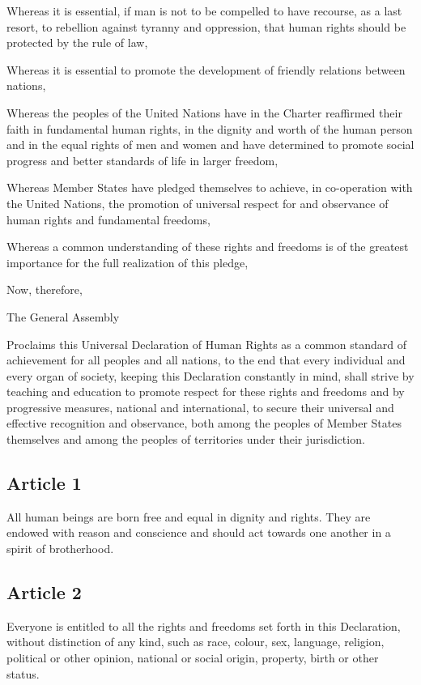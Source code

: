 \documentclass[
  titlepage,
  openright,
  DIV=calc,
  toc=listof,
  listof=nochaptergap]{scrbook}
\begin{document}
Whereas it is essential, if man is not to be compelled to have recourse,
as a last resort, to rebellion against tyranny and oppression, that
human rights should be protected by the rule of law,

Whereas it is essential to promote the development of friendly relations
between nations,

Whereas the peoples of the United Nations have in the Charter reaffirmed
their faith in fundamental human rights, in the dignity and worth of the
human person and in the equal rights of men and women and have
determined to promote social progress and better standards of life in
larger freedom,

Whereas Member States have pledged themselves to achieve, in
co-operation with the United Nations, the promotion of universal respect
for and observance of human rights and fundamental freedoms,

Whereas a common understanding of these rights and freedoms is of the
greatest importance for the full realization of this pledge,

Now, therefore,

The General Assembly

Proclaims this Universal Declaration of Human Rights as a common
standard of achievement for all peoples and all nations, to the end that
every individual and every organ of society, keeping this Declaration
constantly in mind, shall strive by teaching and education to promote
respect for these rights and freedoms and by progressive measures,
national and international, to secure their universal and effective
recognition and observance, both among the peoples of Member States
themselves and among the peoples of territories under their
jurisdiction.

\subsection{Article 1}\label{article-1-3}

All human beings are born free and equal in dignity and rights. They are
endowed with reason and conscience and should act towards one another in
a spirit of brotherhood.

\subsection{Article 2}\label{article-2-3}

Everyone is entitled to all the rights and freedoms set forth in this
Declaration, without distinction of any kind, such as race, colour, sex,
language, religion, political or other opinion, national or social
origin, property, birth or other status.
\end{document}
